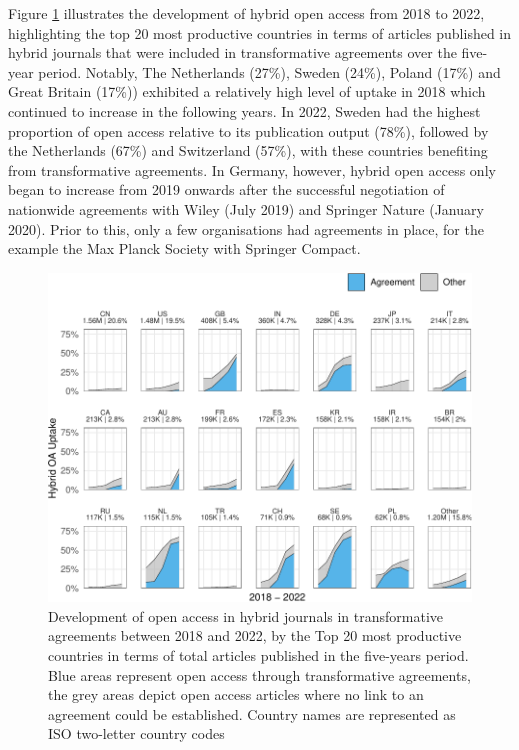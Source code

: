 \documentclass[a4paper,man,floatsintext,longtable,noextraspace,12pt]{apa6}
\begin{document}
Figure \ref{fig:country_top_20_plot} illustrates the development of
hybrid open access from 2018 to 2022, highlighting the top 20 most
productive countries in terms of articles published in hybrid journals
that were included in transformative agreements over the five-year
period. Notably, The Netherlands (27\%), Sweden (24\%), Poland (17\%)
and Great Britain (17\%)) exhibited a relatively high level of uptake in
2018 which continued to increase in the following years. In 2022, Sweden
had the highest proportion of open access relative to its publication
output (78\%), followed by the Netherlands (67\%) and Switzerland
(57\%), with these countries benefiting from transformative agreements.
In Germany, however, hybrid open access only began to increase from 2019
onwards after the successful negotiation of nationwide agreements with
Wiley (July 2019) and Springer Nature (January 2020). Prior to this,
only a few organisations had agreements in place, for the example the
Max Planck Society with Springer Compact.

\begin{figure}[ht!]

{\centering \includegraphics[width=0.99\linewidth,]{fig/country_top_20_plot-1} 

}

\caption{Development of open access in hybrid journals in transformative agreements between 2018 and 2022, by the Top 20 most productive countries in terms of total articles published in the five-years period. Blue areas represent open access through transformative agreements, the grey areas depict open access articles where no link to an agreement could be established. Country names are represented as ISO two-letter country codes}\label{fig:country_top_20_plot}
\end{figure}
\end{document}
